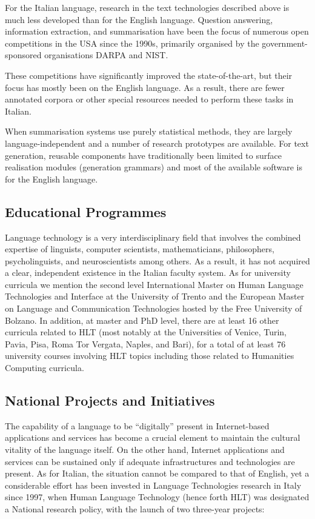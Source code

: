 \begin{multicols}{2}
For the Italian language, research in the text technologies described
above is much less developed than for the English language. Question
answering, information extraction, and summarisation have been the
focus of numerous open competitions in the USA since the 1990s,
primarily organised by the government-sponsored organisations DARPA
and NIST. 

These competitions have significantly improved the state-of-the-art,
but their focus has mostly been on the English language. As a result,
there are fewer annotated corpora or other special resources needed to
perform these tasks in Italian. 

When summarisation systems use purely statistical methods, they are largely language-independent and a number of research prototypes are available. For text generation, reusable components have traditionally been limited to surface realisation modules (generation grammars) and most of the available software is for the English language.


\subsection{Educational Programmes}

Language technology is a very interdisciplinary field that involves
the combined expertise of linguists, computer scientists,
mathematicians, philosophers, psycholinguists, and neuroscientists
among others. As a result, it has not acquired a clear, independent
existence in the Italian faculty system. As for university curricula we mention the second level International Master
on Human Language Technologies and Interface at the University of Trento and
the European Master on Language and Communication Technologies hosted by the
Free University of Bolzano. In addition, at master and PhD level, there are at least 16 other curricula related
to HLT (most notably at the Universities of Venice, Turin, Pavia, Pisa, Roma
Tor Vergata, Naples, and Bari), for a total of at least 76 university
courses involving HLT topics including those related to Humanities Computing curricula.

\subsection{National Projects and Initiatives}

The capability of a language to be “digitally” present in Internet-based applications and services has become a crucial element to maintain the cultural vitality of the language itself. On the other hand, Internet applications and services can be sustained only if adequate infrastructures and technologies are present. As for Italian, the situation cannot be compared to that of English, yet a considerable effort has been invested in Language Technologies research in Italy since 1997, when Human Language Technology (hence forth HLT) was designated a National research policy, with the launch of two three-year projects:


\end{multicols}
